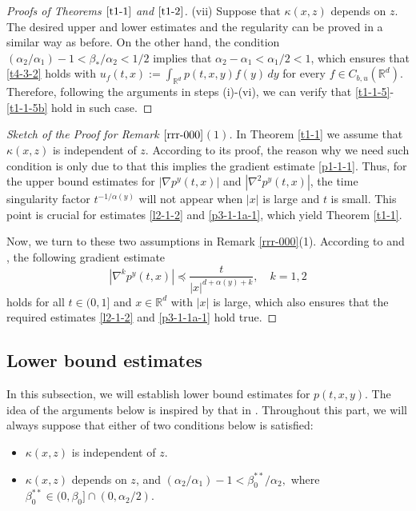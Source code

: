 \documentclass[a4paper,11pt]{amsart}
\newcommand{\R}{\mathds R}
\newcommand{\B}{\beta}
\newcommand{\p}{\preceq}
\newcommand{\K}{\kappa}
\newcommand{\A}{\alpha}
\theoremstyle{definition}
\begin{document}
\begin{proof}[Proofs of Theorems $\ref{t1-1}$ and $\ref{t1-2}$]
\smallskip

(vii) Suppose that $\K(x,z)$ depends on $z$.  The desired upper and lower estimates and the regularity can be proved in a similar way as before. On the other hand, the condition ${(\A_2/\A_1)}-1<\B_*/\alpha_2<{1}/{2}$ implies that
$\A_2-\A_1<{\A_1}/{2}<1$, which ensures that
\eqref{t4-3-2} holds with $u_f(t,x):=\int_{\R^d}p(t,x,y)f(y)\,dy$ for every
$f \in C_{b,u}(\R^d)$. Therefore, following the arguments in steps (i)-(vi), we can verify that \eqref{t1-1-5}-\eqref{t1-1-5b} hold in such case.
\end{proof}


\begin{proof}[Sketch of the Proof for Remark $\ref{rrr-000}$$(1)$] In Theorem \ref{t1-1} we assume that $\K(x,z)$ is independent of $z$.
According to its proof, the reason why we need such condition is only due to that this implies the
gradient estimate \eqref{p1-1-1}. Thus, for the upper bound estimates for $|\nabla p^y(t,x)|$
and  $|\nabla^2 p^y(t,x)|$, the time singularity factor $t^{-{1/\A(y)}}$ will not appear when $|x|$ is large and $t$ is small. This point is
crucial for estimates \eqref{l2-1-2} and \eqref{p3-1-1a-1}, which yield Theorem \ref{t1-1}.

Now, we turn to these two assumptions in Remark \ref{rrr-000}(1). According to \cite[Theorem 1.5]{KR} and  \cite[Corollary 7 and Theorem 21]{BGR}, the following gradient estimate \begin{equation*}
|\nabla^k p^y(t,x)|\p \frac{t}{|x|^{d+\A(y)+k}},\quad k=1,2
\end{equation*} holds for all $t \in (0,1]$ and $x\in\R^d$ with $|x|$ is large,
which also ensures that
the required estimates \eqref{l2-1-2} and \eqref{p3-1-1a-1} hold true.\end{proof}



\subsection{Lower bound estimates}
In this subsection, we will establish lower bound estimates for $p(t,x,y)$. The idea of the arguments below is inspired
by that in \cite[Subsection 4.4]{CZ}. Throughout this part, we will always
suppose that either of two conditions below is satisfied:
\begin{itemize}
\item [(1)] $\K(x,z)$ is independent of $z$.
\item [(2)] $\K(x,z)$ depends on $z$, and $({\A_2}/{\A_1})-1<\B_0^{**}/{\A_2},$ where $\B_0^{**}\in (0,\beta_0]\cap(0,\alpha_2/2).$
\end{itemize}
\end{document}
